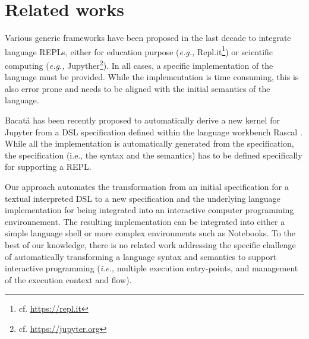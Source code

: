 \section{Related works}
\label{sec:rw}

Various generic frameworks have been proposed in the last decade to integrate language REPLs, either for education purpose (\emph{e.g.,} Repl.it\footnote{cf. \url{https://repl.it}}) or scientific computing (\emph{e.g.,} Jupyther\footnote{cf. \url{https://jupyter.org}}). In all cases, a specific implementation of the language must be provided. While the implementation is time consuming, this is also error prone and needs to be aligned with the initial semantics of the language. 

Bacat\'{a} has been recently proposed to automatically derive a new kernel for Jupyter from a DSL specification defined within the language workbench Rascal \cite{Merino:2018:BLP:3276604.3276981}. While all the implementation is automatically generated from the specification, the specification (i.e., the syntax and the semantics) has to be defined specifically for supporting a REPL. 

Our approach automates the transformation from an initial specification for a textual interpreted DSL to a new specification and the underlying language implementation for being integrated into an interactive computer programming environnement. The resulting implementation can be integrated into either a simple language shell or more complex environments such as Notebooks. To the best of our knowledge, there is no related work addressing the specific challenge of automatically transforming a language syntax and semantics to support interactive programming (\emph{i.e.}, multiple execution entry-points, and management of the execution context and flow).